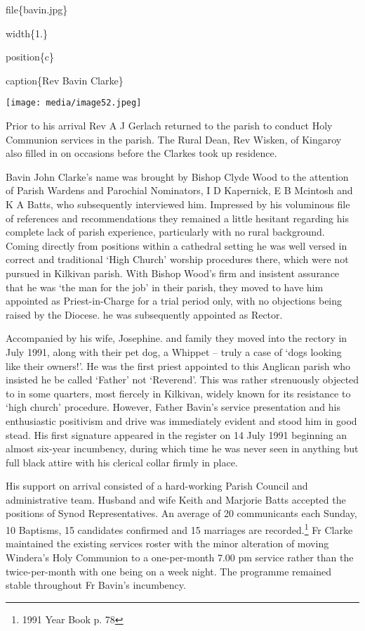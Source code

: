 file\{bavin.jpg\}

width\{1.\}

position\{c\}

caption\{Rev Bavin Clarke\}

\texttt{[image: media/image52.jpeg]}

Prior to his arrival Rev A J Gerlach returned to the parish to conduct Holy Communion services in the parish. The Rural Dean, Rev Wisken, of Kingaroy also filled in on occasions before the Clarkes took up residence.

Bavin John Clarke's name was brought by Bishop Clyde Wood to the attention of Parish Wardens and Parochial Nominators, I D Kapernick, E B Mcintosh and K A Batts, who subsequently interviewed him. Impressed by his voluminous file of references and recommendations they remained a little hesitant regarding his complete lack of parish experience, particularly with no rural background. Coming directly from positions within a cathedral setting he was well versed in correct and traditional `High Church' worship procedures there, which were not pursued in Kilkivan parish. With Bishop Wood's firm and insistent assurance that he was `the man for the job' in their parish, they moved to have him appointed as Priest-in-Charge for a trial period only, with no objections being raised by the Diocese. he was subsequently appointed as Rector.

Accompanied by his wife, Josephine. and family they moved into the rectory in July 1991, along with their pet dog, a Whippet -- truly a case of `dogs looking like their owners!'. He was the first priest appointed to this Anglican parish who insisted he be called `Father' not `Reverend'. This was rather strenuously objected to in some quarters, most fiercely in Kilkivan, widely known for its resistance to `high church' procedure. However, Father Bavin's service presentation and his enthusiastic positivism and drive was immediately evident and stood him in good stead. His first signature appeared in the register on 14 July 1991 beginning an almost six-year incumbency, during which time he was never seen in anything but full black attire with his clerical collar firmly in place.

His support on arrival consisted of a hard-working Parish Council and administrative team. Husband and wife Keith and Marjorie Batts accepted the positions of Synod Representatives. An average of 20 communicants each Sunday, 10 Baptisms, 15 candidates confirmed and 15 marriages are recorded.\footnote{1991 Year Book p. 78} Fr Clarke maintained the existing services roster with the minor alteration of moving Windera's Holy Communion to a one-per-month 7.00 pm service rather than the twice-per-month with one being on a week night. The programme remained stable throughout Fr Bavin's incumbency.

